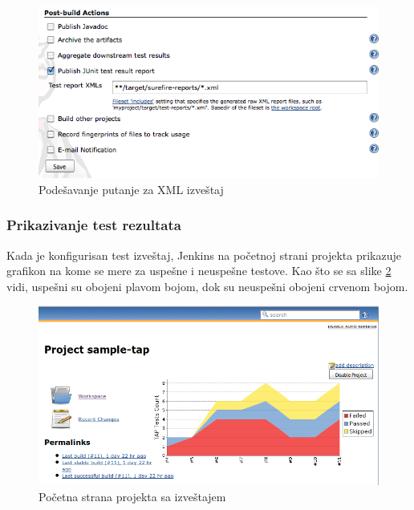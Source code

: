 \begin{figure}[h!]
\begin{center}
\includegraphics[scale=0.5]{slike/test_xml_path.png}
\end{center}
\caption{Podešavanje putanje za XML izveštaj}
\label{fig:test_xml_path}
\end{figure}

\subsubsection{Prikazivanje test rezultata}
Kada je konfigurisan test izveštaj, Jenkins na početnoj strani projekta prikazuje grafikon na kome se mere za uspešne i neuspešne testove. Kao što se sa slike  \ref{fig:test_project_home} vidi, uspešni su obojeni plavom bojom, dok su neuspešni obojeni crvenom bojom. 

\begin{figure}
\begin{center}
\includegraphics[scale=0.45]{slike/test_project_home.png}
\end{center}
\caption{Početna strana projekta sa izveštajem}
\label{fig:test_project_home}
\end{figure}


